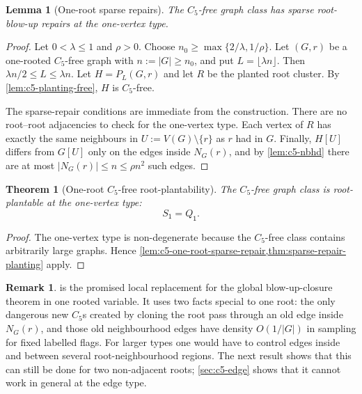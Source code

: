 \documentclass[11pt]{article}
\newtheorem{theorem}{Theorem}
\newtheorem{lemma}[lemma]{Lemma}
\theoremstyle{definition}
\newtheorem{remark}[remark]{Remark}
\newcommand{\vtype}{\mathsf{1}}
\begin{document}
\begin{lemma}[One-root sparse repairs]\label{lem:c5-one-root-sparse-repair}
The $C_5$-free graph class has sparse root-blow-up repairs at the one-vertex
type.
\end{lemma}

\begin{proof}
Let $0<\lambda\le1$ and $\rho>0$.  Choose
$n_0\ge \max\{2/\lambda,1/\rho\}$.  Let $(G,r)$ be a one-rooted $C_5$-free graph
with $n:=|G|\ge n_0$, and put $L=\lfloor\lambda n\rfloor$.  Then
$\lambda n/2\le L\le\lambda n$.  Let $H=P_L(G,r)$ and let $R$ be the planted
root cluster.  By \cref{lem:c5-planting-free}, $H$ is $C_5$-free.

The sparse-repair conditions are immediate from the construction.  There are no
root--root adjacencies to check for the one-vertex type.  Each vertex of $R$ has
exactly the same neighbours in $U:=V(G)\setminus\{r\}$ as $r$ had in $G$.  Finally,
$H[U]$ differs from $G[U]$ only on the edges inside $N_G(r)$, and by
\cref{lem:c5-nbhd} there are at most $|N_G(r)|\le n\le\rho n^2$ such edges.
\end{proof}

\begin{theorem}[One-root $C_5$-free root-plantability]\label{thm:c5-one-root}
The $C_5$-free graph class is root-plantable at the one-vertex type:
\[
  S_{\vtype}=Q_{\vtype}.
\]
\end{theorem}

\begin{proof}
The one-vertex type is non-degenerate because the $C_5$-free class contains
arbitrarily large graphs.  Hence
\cref{lem:c5-one-root-sparse-repair,thm:sparse-repair-planting} apply.
\end{proof}

\begin{remark}
 is the promised local replacement for the global
blow-up-closure theorem in one rooted variable.  It uses two facts special to one root:
the only dangerous new $C_5$s created by cloning the root pass through an old
edge inside $N_G(r)$, and those old neighbourhood edges have density
$O(1/|G|)$ in sampling for fixed labelled flags.  For larger types one would have to control
edges inside and between several root-neighbourhood regions.  The next result
shows that this can still be done for two non-adjacent roots; \cref{sec:c5-edge}
shows that it cannot work in general at the edge type.
\end{remark}
\end{document}
